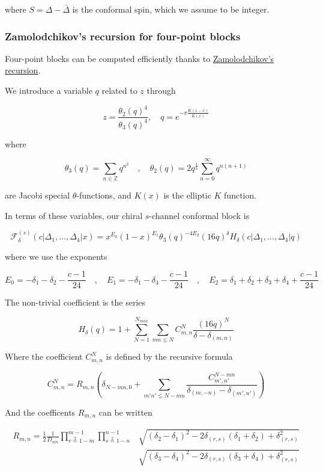 \documentclass[a4paper]{article}
\numberwithin{equation}{section}
\begin{document}
where \(S=\Delta-\bar\Delta\) is the conformal spin, which we assume to be integer.
\subsubsection*{Zamolodchikov's recursion for four-point blocks}
\label{sec:org6398ced}

Four-point blocks can be computed efficiently thanks to \href{https://en.wikipedia.org/wiki/Virasoro\_conformal\_block}{Zamolodchikov's recursion}.

We introduce a variable \(q\) related to \(z\) through

\[
z = \frac{\theta_2(q)^4}{\theta_3(q)^4}, \quad q = e^{-\pi\frac{K(1-x)}{ K(x)}}
\]

where

\[
\theta_3(q) = \sum_{n\in\mathbb{Z}} q^{n^2} \quad , \quad \theta_2(q) = 2q^\frac14\sum_{n=0}^\infty q^{n(n+1)}
\]

are Jacobi special \(\theta\)-functions, and \(K(x)\) is the elliptic \(K\) function.

In terms of these variables, our chiral \(s\)-channel conformal block is

\[
\mathcal{F}^{(s)}_{\delta}(c | \Delta_{1}, \dots, \Delta_{4} | x) =  x^{E_0} (1-x)^{E_1} \theta_3(q)^{-4E_2}
(16q)^{\delta} H_{\delta}(c | \Delta_{1},\dots, \Delta_{4} | q)
\]

where we use the exponents

\[
E_0 = -\delta_1-\delta_2-\frac{c-1}{24} \quad , \quad E_1 = -\delta_1-\delta_4-\frac{c-1}{24} \quad ,
\quad E_2 = \delta_1+\delta_2+\delta_3+\delta_4+\frac{c-1}{24}
\]

The non-trivial coefficient is the series

\[
H_{\delta}(q) = 1 + \sum_{N=1}^{N_{max}} \sum_{mn\leq N} C_{m,n}^N \frac{(16q)^N}{\delta-\delta_{(m,n)}}
\]

Where the coefficient \(C_{m,n}^N\) is defined by the recursive formula

\[
C^N_{m,n} = R_{m,n}\left(\delta_{N-mn,0} + \sum_{m'n'\leq N-mn} \frac{C^{N-mn}_{m',n'}}{\delta_{(m,-n)}-\delta_{(m',n')}} \right)
\]

And the coefficents \(R_{m,n}\) can be written

\begin{align}
 R_{m,n} = \frac{1}{2}\frac{1}{D_{mn}}
\prod_{r\overset{2}{=} 1-m}^{m-1}
\prod_{s\overset{2}{=}1-n}^{n-1}
&\sqrt{(\delta_2-\delta_1)^2 -2\delta_{(r,s)}(\delta_1+\delta_2) + \delta_{(r,s)}^2}\nonumber\\
&\sqrt{(\delta_3-\delta_4)^2 -2\delta_{(r,s)}(\delta_3+\delta_4) + \delta_{(r,s)}^2}
\end{align}
\end{document}

